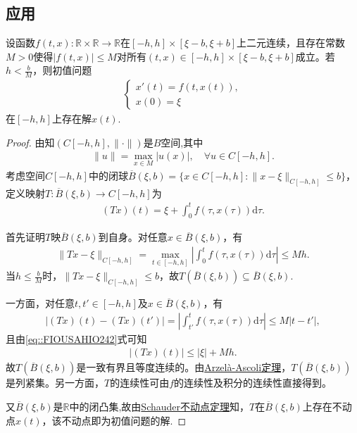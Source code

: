 \documentclass[../../main.tex]{subfiles}%
\begin{document}
\subsection{应用}

\begin{theorem}[Caratheodory定理]\label{theorem:Caratheodory定理}
设函数$f(t,x):\mathbb{R}\times\mathbb{R}\to\mathbb{R}$在$[-h,h]\times[\xi-b,\xi+b]$上二元连续，且存在常数$M>0$使得$|f(t,x)|\leqslant M$对所有$(t,x)\in[-h,h]\times[\xi-b,\xi+b]$成立。若$h<\frac{b}{M}$，则初值问题
\begin{align*}
\begin{cases}
x'(t)=f(t,x(t)), \\
x(0)=\xi
\end{cases}
\end{align*}
在$[-h,h]$上存在解$x(t)$.
\end{theorem}
\begin{proof}
由知$(C[-h,h],\|\cdot\|)$是$B$空间,其中
\begin{align*}
\|u\|=\max_{x\in M}|u(x)|,\quad \forall u\in C[-h,h].
\end{align*}
考虑空间$C[-h,h]$中的闭球$\overline{B}(\xi,b)=\{x\in C[-h,h]:\|x-\xi\|_{C[-h,h]}\leqslant b\}$，定义映射$T:\overline{B}(\xi,b)\to C[-h,h]$为
\begin{align*}
(Tx)(t)=\xi+\int_{0}^{t}f(\tau,x(\tau))\mathrm{d}\tau.
\end{align*}

首先证明$T$映$\overline{B}(\xi,b)$到自身。对任意$x\in\overline{B}(\xi,b)$，有
\begin{align}\label{eq::FIOUSAHIO242}
\|Tx-\xi\|_{C[-h,h]}=\max_{t\in[-h,h]}\left|\int_{0}^{t}f(\tau,x(\tau))\mathrm{d}\tau\right|\leqslant Mh.
\end{align}
当$h\leqslant\frac{b}{M}$时，$\|Tx-\xi\|_{C[-h,h]}\leqslant b$，故$T(\overline{B}(\xi,b))\subseteq\overline{B}(\xi,b)$.

一方面，对任意$t,t'\in[-h,h]$及$x\in\overline{B}(\xi,b)$，有
\begin{align*}
|(Tx)(t)-(Tx)(t')|=\left|\int_{t'}^{t}f(\tau,x(\tau))\mathrm{d}\tau\right|\leqslant M|t-t'|,
\end{align*}
且由\eqref{eq::FIOUSAHIO242}式可知
\begin{align*}
|(Tx)(t)|\leqslant|\xi|+Mh.
\end{align*}
故$T(\overline{B}(\xi,b))$是一致有界且等度连续的。由\hyperref[theorem:泛函分析--Arzelà-Ascoli定理]{Arzelà-Ascoli定理}，$T(\overline{B}(\xi,b))$是列紧集。另一方面，$T$的连续性可由$f$的连续性及积分的连续性直接得到。

又$\overline{B}(\xi,b)$是$\mathbb{R}$中的闭凸集,故由\hyperref[theorem:泛函分析---Schauder不动点定理]{Schauder不动点定理}知，$T$在$\overline{B}(\xi,b)$上存在不动点$x(t)$，该不动点即为初值问题的解.
\end{proof}
\end{document}
